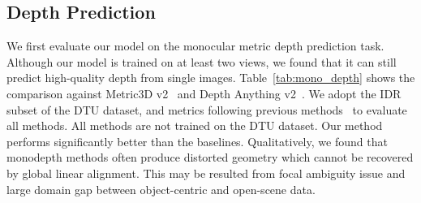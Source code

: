 \subsection{Depth Prediction}\label{sec:exp-depth}
 We first evaluate our model on the monocular metric depth prediction task. Although our model is trained on at least two views, we found that it can still predict high-quality depth from single images. Table~\ref{tab:mono_depth} shows the comparison against Metric3D v2~\cite{hu2024metric3d} and Depth Anything v2~\cite{depth_anything_v2}. We adopt the IDR~\cite{yariv2020multiview} subset of the DTU dataset, and metrics following previous methods~\cite{hu2024metric3d} to evaluate all methods. All methods are not trained on the DTU dataset. Our method performs significantly better than the baselines. Qualitatively, we found that monodepth methods often produce distorted geometry which cannot be recovered by global linear alignment. This may be resulted from focal ambiguity issue and large domain gap between object-centric and open-scene data.

